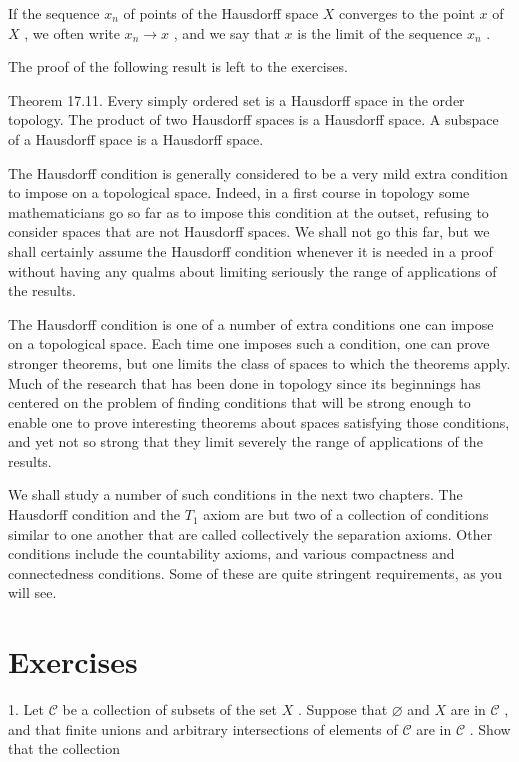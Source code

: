 If the sequence \({x}_{n}\) of points of the Hausdorff space \(X\) converges to the point \(x\) of \(X\) , we often write \({x}_{n} \rightarrow  x\) , and we say that \(x\) is the limit of the sequence \({x}_{n}\) .

The proof of the following result is left to the exercises.

Theorem 17.11. Every simply ordered set is a Hausdorff space in the order topology. The product of two Hausdorff spaces is a Hausdorff space. A subspace of a Hausdorff space is a Hausdorff space.

The Hausdorff condition is generally considered to be a very mild extra condition to impose on a topological space. Indeed, in a first course in topology some mathematicians go so far as to impose this condition at the outset, refusing to consider spaces that are not Hausdorff spaces. We shall not go this far, but we shall certainly assume the Hausdorff condition whenever it is needed in a proof without having any qualms about limiting seriously the range of applications of the results.

The Hausdorff condition is one of a number of extra conditions one can impose on a topological space. Each time one imposes such a condition, one can prove stronger theorems, but one limits the class of spaces to which the theorems apply. Much of the research that has been done in topology since its beginnings has centered on the problem of finding conditions that will be strong enough to enable one to prove interesting theorems about spaces satisfying those conditions, and yet not so strong that they limit severely the range of applications of the results.

We shall study a number of such conditions in the next two chapters. The Hausdorff condition and the \({T}_{1}\) axiom are but two of a collection of conditions similar to one another that are called collectively the separation axioms. Other conditions include the countability axioms, and various compactness and connectedness conditions. Some of these are quite stringent requirements, as you will see.

\section*{Exercises}

1. Let \(\mathcal{C}\) be a collection of subsets of the set \(X\) . Suppose that \(\varnothing\) and \(X\) are in \(\mathcal{C}\) , and that finite unions and arbitrary intersections of elements of \(\mathcal{C}\) are in \(\mathcal{C}\) . Show that the collection

